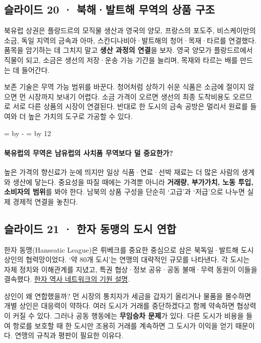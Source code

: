 \documentclass[10pt,a4paper]{article}
\newcommand{\ReserveQuestionSpace}{%
  \par\begingroup
  \dimen0=\pagegoal \advance\dimen0 by -\pagetotal
  \dimen2=\baselineskip \multiply\dimen2 by 12
  \ifdim\dimen0<\dimen2 \newpage\fi
  \endgroup}
\begin{document}
\subsection{슬라이드 20 · 북해·발트해 무역의 상품 구조}
북유럽 상권은 플랑드르의 모직물 생산과 영국의 양모, 프랑스의 포도주, 비스케이만의 소금, 독일 지역의 금속과 아마, 스칸디나비아·발트해의 청어·목재·타르를 연결했다. 품목을 암기하는 데 그치지 말고 \textbf{생산 과정의 연결}을 보자. 영국 양모가 플랑드르에서 직물이 되고, 소금은 생선의 저장·운송 가능 기간을 늘리며, 목재와 타르는 배를 만드는 데 들어간다.\par

보존 기술은 무역 가능 범위를 바꾼다. 청어처럼 상하기 쉬운 식품은 소금에 절이지 않으면 먼 시장까지 보내기 어렵다. 소금 가격이 오르면 생선의 최종 도착비용도 오르므로 서로 다른 상품의 시장이 연결된다. 반대로 한 도시의 금속 공방은 멀리서 원료를 들여와 더 높은 가치의 도구로 가공할 수 있다.\par

\ReserveQuestionSpace
\paragraph{북유럽의 무역은 남유럽의 사치품 무역보다 덜 중요한가?}
높은 가격의 향신료가 눈에 띄지만 일상 식품·연료·선박 재료는 더 많은 사람의 생계와 생산에 닿는다. 중요성을 따질 때에는 가격뿐 아니라 \textbf{거래량, 부가가치, 노동 투입, 소비자의 범위}를 봐야 한다. 남북의 상품 구성을 단순히 ‘고급’과 ‘저급’으로 나누면 실제 경제적 연결을 놓친다.\par

\subsection{슬라이드 21 · 한자 동맹의 도시 연합}
한자 동맹(Hanseatic League)은 뤼베크를 중요한 중심으로 삼은 북독일·발트해 도시 상인의 협력망이었다. ‘약 80개 도시’는 연맹의 대략적인 규모를 나타낸다. 각 도시는 자체 정치와 이해관계를 지녔고, 특권 협상·정보 공유·공동 불매·무력 동원이 이들을 결속했다. \href{https://www.hanse.org/en/the-medieval-hanseatic-league/the-origins}{한자 역사 네트워크의 기원 설명}.\par

상인이 왜 연합했을까? 먼 시장의 통치자가 세금을 갑자기 올리거나 물품을 몰수하면 개별 상인은 대응력이 약하다. 여러 도시가 거래를 중단하겠다고 함께 약속하면 협상력이 커질 수 있다. 그러나 공동 행동에는 \textbf{무임승차 문제}가 있다. 다른 도시가 비용을 들여 항로를 보호할 때 한 도시만 조용히 거래를 계속하면 그 도시가 이익을 얻기 때문이다. 연맹의 규칙과 평판이 필요한 이유다.\par
\end{document}
